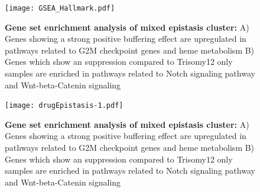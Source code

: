\clearpage

\begin{figure}
	\centering
	\texttt{[image: GSEA\_Hallmark.pdf]}
	\caption{\textbf{Gene set enrichment analysis of mixed epistasis cluster:} A) Genes showing a strong positive buffering effect are upregulated in pathways related to G2M checkpoint genes and heme metabolism B) Genes which show an suppression compared to Trisomy12 only samples are enriched in pathways related to Notch signaling pathway and Wnt-beta-Catenin signaling}
	\label{fig:GSEA_hallmark}
\end{figure}


\clearpage

\begin{figure}
	\centering
	\texttt{[image: drugEpistasis-1.pdf]}
	\caption{\textbf{Gene set enrichment analysis of mixed epistasis cluster:} A) Genes showing a strong positive buffering effect are upregulated in pathways related to G2M checkpoint genes and heme metabolism B) Genes which show an suppression compared to Trisomy12 only samples are enriched in pathways related to Notch signaling pathway and Wnt-beta-Catenin signaling}
	\label{fig:drugEpistasis-1}
\end{figure}